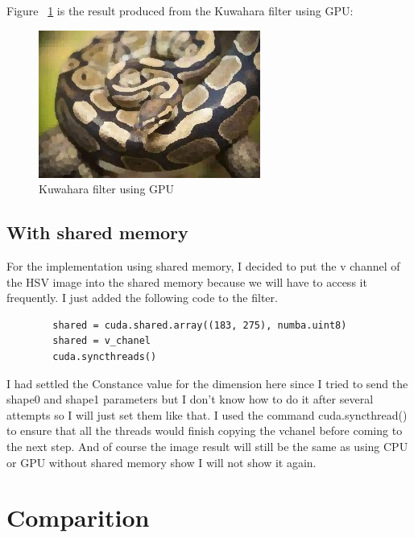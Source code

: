\documentclass{article}
\begin{document}
	Figure ~\ref{fig:filter_image_gpu} is the result produced from the Kuwahara filter using GPU:
	
	\begin{figure}
		\includegraphics[width=\linewidth]{filtered_image_gpu.jpg}
		\caption{ Kuwahara filter using GPU}
		\label{fig:filter_image_gpu}
	\end{figure}
	
	\subsection{With shared memory}
	
	For the implementation using shared memory, I decided to put the v channel of the HSV image into the shared memory because we will have to access it frequently. I just added the following code to the filter.
	
	\begin{verbatim}
		shared = cuda.shared.array((183, 275), numba.uint8)
		shared = v_chanel
		cuda.syncthreads()
	\end{verbatim}
	
	I had settled the Constance value for the dimension here since I tried to send the shape0 and shape1 parameters but I don't know how to do it after several attempts so I will just set them like that. I used the command cuda.syncthread() to ensure that all the threads would finish copying the vchanel before coming to the next step. And of course the image result will still be the same as using CPU or GPU without shared memory show I will not show it again.
	
	\section{Comparition}
	
\end{document}
